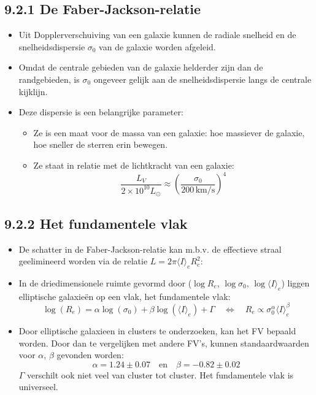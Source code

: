 \documentclass[10pt,a4paper]{article}
\renewenvironment{equation}{\begin{equation*}}{\end{equation*}}
\begin{document}
\subsection*{9.2.1 De Faber-Jackson-relatie}  
\begin{itemize}
  \item Uit Dopplerverschuiving van een galaxie kunnen de radiale snelheid en de snelheidsdispersie $\sigma_0$ van de galaxie worden afgeleid.
  \item Omdat de centrale gebieden van de galaxie helderder zijn dan de randgebieden, is $\sigma_0$ ongeveer gelijk aan de snelheidsdispersie langs de centrale kijklijn.
  \item Deze dispersie is een belangrijke parameter:
  \begin{itemize}
    \item Ze is een maat voor de massa van een galaxie: hoe massiever de galaxie, hoe sneller de sterren erin bewegen.
    \item Ze staat in relatie met de lichtkracht van een galaxie:
    \begin{equation}
    \frac{L_V}{2\times10^{10}L_\odot}\approx\left(\frac{\sigma_0}{200\,\mathrm{km/s}}\right)^4
    \tag{9.9}
    \end{equation}
  \end{itemize}
\end{itemize}
\subsection*{9.2.2 Het fundamentele vlak}
\begin{itemize}
  \item De schatter in de Faber-Jackson-relatie kan m.b.v. de effectieve straal geelimineerd worden via de relatie $L=2\pi \langle I\rangle_eR_e^2$:
  \item In de driedimensionele ruimte gevormd door ($\log R_e$, $\log \sigma_0$, $\log \langle I\rangle_e$) liggen elliptische galaxieën op een vlak, het fundamentele vlak:
  \begin{equation}
  \log(R_e)=\alpha \log(\sigma_0)+\beta \log(\langle I\rangle_e)+\Gamma
  \quad \Longleftrightarrow \quad
  R_e\propto \sigma_0^\alpha \langle I\rangle_e^\beta
  \tag{9.10}
  \end{equation}
  \item Door elliptische galaxieen in clusters te onderzoeken, kan het FV bepaald worden. Door dan te vergelijken met andere FV's, kunnen standaardwaarden voor $\alpha$, $\beta$ gevonden worden:
  \begin{equation}
  \alpha=1.24\pm0.07 \quad \text{en} \quad \beta=-0.82\pm0.02
  \tag{9.11}
  \end{equation}
  $\Gamma$ verschilt ook niet veel van cluster tot cluster. Het fundamentele vlak is universeel.
\end{itemize}
\end{document}
